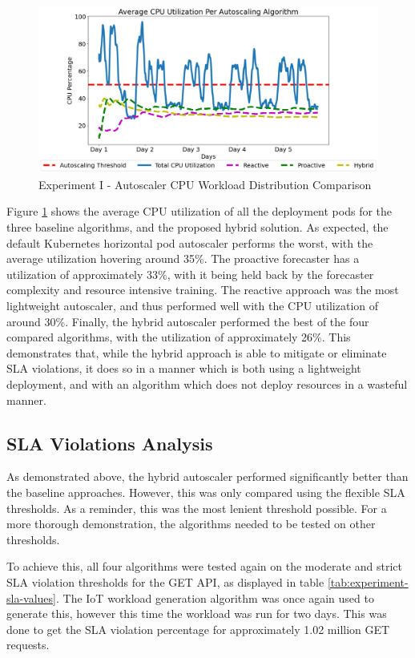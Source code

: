 \begin{figure}[htb]
    \centering
    \caption{Experiment I - Autoscaler CPU Workload Distribution Comparison}
    \label{fig:exp1-cpu-avg-dist}
    \includegraphics[width=0.6\linewidth]{Figures/Home-Timeline-CPU-Usage.png}
\end{figure}

Figure \ref{fig:exp1-cpu-avg-dist} shows the average CPU utilization of all the deployment pods for the three baseline algorithms, and the proposed hybrid solution. As expected, the default Kubernetes horizontal pod autoscaler performs the worst, with the average utilization hovering around 35\%. The proactive forecaster has a utilization of approximately 33\%, with it being held back by the forecaster complexity and resource intensive training. The reactive approach was the most lightweight autoscaler, and thus performed well with the CPU utilization of around 30\%. Finally, the hybrid autoscaler performed the best of the four compared algorithms, with the utilization of approximately 26\%. This demonstrates that, while the hybrid approach is able to mitigate or eliminate SLA violations, it does so in a manner which is both using a lightweight deployment, and with an algorithm which does not deploy resources in a wasteful manner.\par

\subsection{SLA Violations Analysis}
\label{subsec:ch5-exp1-sla-violations}

As demonstrated above, the hybrid autoscaler performed significantly better than the baseline approaches. However, this was only compared using the flexible SLA thresholds. As a reminder, this was the most lenient threshold possible. For a more thorough demonstration, the algorithms needed to be tested on other thresholds.\par

To achieve this, all four algorithms were tested again on the moderate and strict SLA violation thresholds for the GET API, as displayed in table \ref{tab:experiment-sla-values}. The IoT workload generation algorithm was once again used to generate this, however this time the workload was run for two days. This was done to get the SLA violation percentage for approximately 1.02 million GET requests.\par

